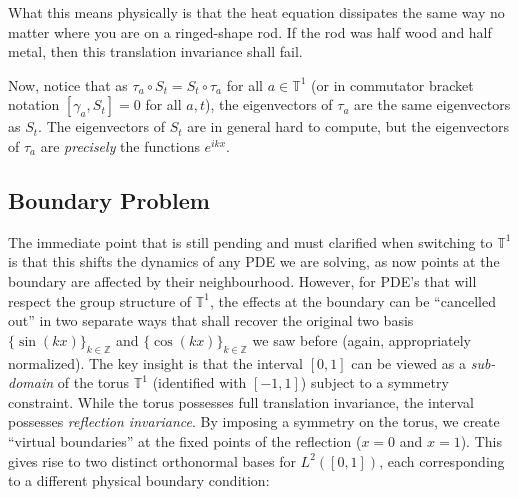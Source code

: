 \documentclass{article}
\newcommand{\T}{{\mathbb{T}}}
\newcommand{\Z}{{\mathbb{Z}}}
\begin{document}
What this means physically is that the heat equation dissipates the same way no matter where you are on a
ringed-shape rod. If the rod was half wood and half metal, then this translation invariance shall fail.

Now, notice that as $\tau_a \circ S_t = S_t \circ \tau_a$ for all $a \in \T^1$ (or in commutator bracket
notation $[\gamma_a, S_t] = 0$ for all $a,t$), the eigenvectors of $\tau_a$ are the same eigenvectors as
$S_t$. The eigenvectors of $S_t$ are in general hard to compute, but the eigenvectors of $\tau_a$ are
\emph{precisely} the functions $e^{ikx}$.


\subsection*{Boundary Problem}

The immediate point that is still pending and must clarified when switching to $\T^1$ is that this shifts the
dynamics of any PDE we are solving, as now points at the boundary are affected by their neighbourhood.
However, for PDE's that will respect the group structure of $\T^1$, the effects at the boundary can be
``cancelled out'' in two separate ways that shall recover the original two basis $\{\sin(kx)\}_{k \in \Z}$ and
$\{\cos(kx)\}_{k \in \Z}$ we saw before (again, appropriately normalized). The key insight is that the
interval $[0,1]$ can be viewed as a \emph{sub-domain} of the torus $\T^1$ (identified with $[-1,1]$) subject
to a symmetry constraint. While the torus possesses full translation invariance, the interval possesses
\emph{reflection invariance}. By imposing a symmetry on the torus, we create ``virtual boundaries'' at the
fixed points of the reflection ($x=0$ and $x=1$). This gives rise to two distinct orthonormal bases for
$L^2([0,1])$, each corresponding to a different physical boundary condition:
\end{document}
